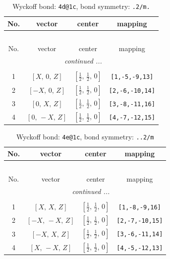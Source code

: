 \documentclass[fleqn,8pt]{jsarticle}
\begin{document}
\begin{longtable}{cccc}
\caption{Wyckoff bond: {\tt 4d@1c}, bond symmetry: {\tt .2/m.}}
 \\
 \hline \hline
No. & vector & center & mapping \\ \hline \endfirsthead

\multicolumn{3}{l}{\tablename\ \thetable{}} \\
 \hline \hline
No. & vector & center & mapping \\ \hline \endhead

 \hline \hline
\multicolumn{3}{r}{\footnotesize\it continued ...} \\ \endfoot

 \hline \hline
\multicolumn{3}{r}{} \\ \endlastfoot

1 & $\left[ X,\, 0,\, Z \right]$ & $\left[ \frac{1}{2},\, \frac{1}{2},\, 0 \right]$ & {\tt [1,-5,-9,13]} \\ \hline
2 & $\left[ - X,\, 0,\, Z \right]$ & $\left[ \frac{1}{2},\, \frac{1}{2},\, 0 \right]$ & {\tt [2,-6,-10,14]} \\ \hline
3 & $\left[ 0,\, X,\, Z \right]$ & $\left[ \frac{1}{2},\, \frac{1}{2},\, 0 \right]$ & {\tt [3,-8,-11,16]} \\ \hline
4 & $\left[ 0,\, - X,\, Z \right]$ & $\left[ \frac{1}{2},\, \frac{1}{2},\, 0 \right]$ & {\tt [4,-7,-12,15]} \\
\end{longtable}
\renewcommand{\arraystretch}{1.2}
\begin{longtable}{cccc}
\caption{Wyckoff bond: {\tt 4e@1c}, bond symmetry: {\tt ..2/m}}
 \\
 \hline \hline
No. & vector & center & mapping \\ \hline \endfirsthead

\multicolumn{3}{l}{\tablename\ \thetable{}} \\
 \hline \hline
No. & vector & center & mapping \\ \hline \endhead

 \hline \hline
\multicolumn{3}{r}{\footnotesize\it continued ...} \\ \endfoot

 \hline \hline
\multicolumn{3}{r}{} \\ \endlastfoot

1 & $\left[ X,\, X,\, Z \right]$ & $\left[ \frac{1}{2},\, \frac{1}{2},\, 0 \right]$ & {\tt [1,-8,-9,16]} \\ \hline
2 & $\left[ - X,\, - X,\, Z \right]$ & $\left[ \frac{1}{2},\, \frac{1}{2},\, 0 \right]$ & {\tt [2,-7,-10,15]} \\ \hline
3 & $\left[ - X,\, X,\, Z \right]$ & $\left[ \frac{1}{2},\, \frac{1}{2},\, 0 \right]$ & {\tt [3,-6,-11,14]} \\ \hline
4 & $\left[ X,\, - X,\, Z \right]$ & $\left[ \frac{1}{2},\, \frac{1}{2},\, 0 \right]$ & {\tt [4,-5,-12,13]} \\
\end{longtable}
\end{document}
